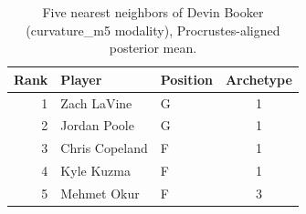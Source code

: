 \begin{table}[htbp]
  \centering\small
  \begin{tabular}{rllc}
    \toprule
    Rank & Player & Position & Archetype \\
    \midrule
    1 & Zach LaVine & G & 1 \\
    2 & Jordan Poole & G & 1 \\
    3 & Chris Copeland & F & 1 \\
    4 & Kyle Kuzma & F & 1 \\
    5 & Mehmet Okur & F & 3 \\
    \bottomrule
  \end{tabular}
  \caption{Five nearest neighbors of Devin Booker (curvature_m5 modality), Procrustes-aligned posterior mean.}
  \label{tab:Devin_Booker_neighbors_curvature_m5}
\end{table}

